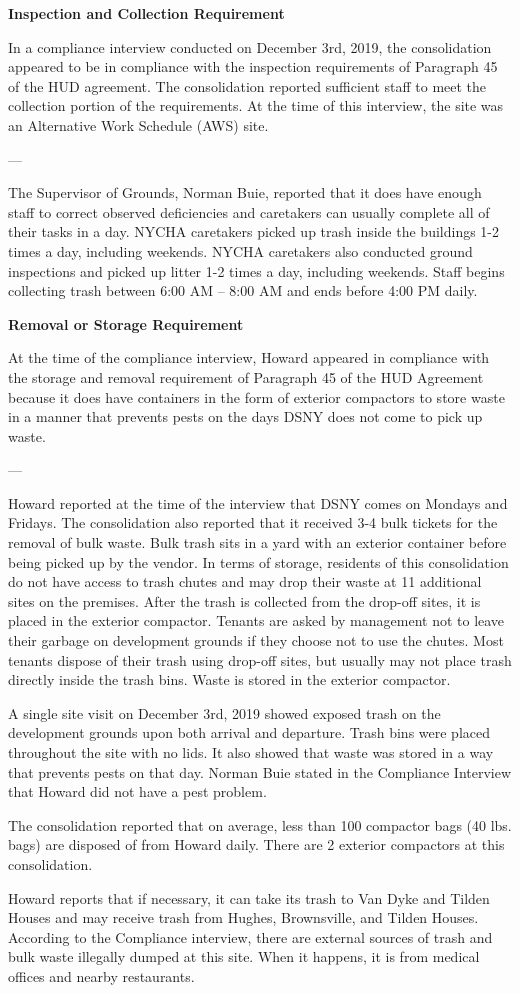 

\textbf{Inspection and Collection Requirement}

In a compliance interview conducted on December 3rd, 2019, the consolidation appeared to be in compliance with the inspection requirements of Paragraph 45 of the HUD agreement. The consolidation reported sufficient staff to meet the collection portion of the requirements. At the time of this interview, the site was an Alternative Work Schedule (AWS) site. 

---

The Supervisor of Grounds, Norman Buie, reported that it does have enough staff to correct observed deficiencies and caretakers can usually complete all of their tasks in a day. NYCHA caretakers picked up trash inside the buildings 1-2 times a day, including weekends. NYCHA caretakers also conducted ground inspections and picked up litter 1-2 times a day, including weekends. Staff begins collecting trash between 6:00 AM -- 8:00 AM and ends before 4:00 PM daily.

\textbf{Removal or Storage Requirement}

At the time of the compliance interview, Howard appeared in compliance with the storage and removal requirement of Paragraph 45 of the HUD Agreement because it does have containers in the form of exterior compactors to store waste in a manner that prevents pests on the days DSNY does not come to pick up waste. 

---

Howard reported at the time of the interview that DSNY comes on Mondays and Fridays. The consolidation also reported that it received 3-4 bulk tickets for the removal of bulk waste. Bulk trash sits in a yard with an exterior container before being picked up by the vendor. In terms of storage, residents of this consolidation do not have access to trash chutes and may drop their waste at 11 additional sites on the premises. After the trash is collected from the drop-off sites, it is placed in the exterior compactor. Tenants are asked by management not to leave their garbage on development grounds if they choose not to use the chutes. Most tenants dispose of their trash using drop-off sites, but usually may not place trash directly inside the trash bins. Waste is stored in the exterior compactor. 

A single site visit on December 3rd, 2019 showed exposed trash on the development grounds upon both arrival and departure. Trash bins were placed throughout the site with no lids. It also showed that waste was stored in a way that prevents pests on that day. Norman Buie stated in the Compliance Interview that Howard did not have a pest problem. 

The consolidation reported that on average, less than 100 compactor bags (40 lbs. bags) are disposed of from Howard daily. There are 2 exterior compactors at this consolidation.

Howard reports that if necessary, it can take its trash to Van Dyke and Tilden Houses and may receive trash from Hughes, Brownsville, and Tilden Houses. According to the Compliance interview, there are external sources of trash and bulk waste illegally dumped at this site. When it happens, it is from medical offices and nearby restaurants. 